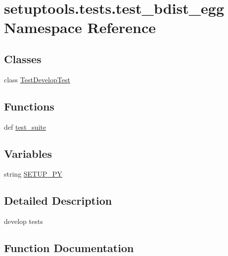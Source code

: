 \hypertarget{namespacesetuptools_1_1tests_1_1test__bdist__egg}{}\section{setuptools.\+tests.\+test\+\_\+bdist\+\_\+egg Namespace Reference}
\label{namespacesetuptools_1_1tests_1_1test__bdist__egg}
\subsection*{Classes}
\begin{DoxyCompactItemize}
\item 
class \hyperlink{classsetuptools_1_1tests_1_1test__bdist__egg_1_1TestDevelopTest}{Test\+Develop\+Test}
\end{DoxyCompactItemize}
\subsection*{Functions}
\begin{DoxyCompactItemize}
\item 
def \hyperlink{namespacesetuptools_1_1tests_1_1test__bdist__egg_a9b5e5e31dc332a598673fa945274bb17}{test\+\_\+suite}
\end{DoxyCompactItemize}
\subsection*{Variables}
\begin{DoxyCompactItemize}
\item 
string \hyperlink{namespacesetuptools_1_1tests_1_1test__bdist__egg_a01e6f3f09fa202e1af290325cdfe5081}{S\+E\+T\+U\+P\+\_\+\+P\+Y}
\end{DoxyCompactItemize}


\subsection{Detailed Description}
\begin{DoxyVerb}develop tests
\end{DoxyVerb}
 

\subsection{Function Documentation}
\hypertarget{namespacesetuptools_1_1tests_1_1test__bdist__egg_a9b5e5e31dc332a598673fa945274bb17}{}
